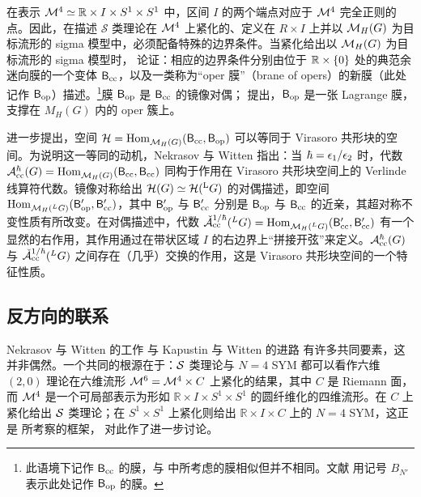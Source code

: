 在表示 $\mathcal{M}^4\simeq\mathbb{R}\times I\times S^1\times S^1$ 中，区间 $I$ 的两个端点对应于 $\mathcal{M}^4$ 完全正则的点。因此，在描述 $\mathcal{S}$ 类理论在 $\mathcal{M}^4$ 上紧化的、定义在 $R\times I$ 上并以 $\mathcal{M}_H(G)$ 为目标流形的 sigma 模型中，必须配备特殊的边界条件。当紧化给出以 $\mathcal{M}_H(G)$ 为目标流形的 sigma 模型时，\cite{NW} 论证：相应的边界条件分别由位于 $\mathbb{R}\times\{0\}$ 处的典范余迷向膜的一个变体 $\mathsf{B}_{\rm cc}$，以及一类称为“oper 膜”（brane of opers）的新膜（此处记作 $\mathsf{B}_{\rm op}$）描述。\footnote{此语境下记作 $\mathsf{B}_{\rm cc}$ 的膜，与 \cite{KW} 中所考虑的膜相似但并不相同。文献 \cite{NW} 用记号 $B_{N'}$ 表示此处记作 $\mathsf{B}_{\rm op}$ 的膜。}膜 $\mathsf{B}_{\rm op}$ 是 $\mathsf{B}_{\rm cc}$ 的镜像对偶；\cite{NW} 提出，$\mathsf{B}_{\rm op}$ 是一张 Lagrange 膜，支撑在 $M_H(G)$ 内的 oper 簇上。

\cite{NW} 进一步提出，空间 $\mathcal{H}={\rm Hom}_{\mathcal{M}_H(G)}^{}(\mathsf{B}_{\rm cc},\mathsf{B}_{\rm op})$ 可以等同于 Virasoro 共形块的空间。为说明这一等同的动机，Nekrasov 与 Witten 指出：当 $\hbar=\epsilon_1/\epsilon_2$ 时，代数 $\mathcal{A}_{\rm cc}^{\hbar}(G)={\rm Hom}_{\mathcal{M}_H(G)}^{}(\mathsf{B}_{\rm cc},\mathsf{B}_{\rm cc})$ 同构于作用在 Virasoro 共形块空间上的 Verlinde 线算符代数。镜像对称给出 $\mathcal{H}(G)\simeq\mathcal{H}({}^{\rm L}G)$ 的对偶描述，即空间 ${\rm Hom}_{\mathcal{M}_H({}^{L}G)}^{}({\mathsf{B}}_{\rm op}',{\mathsf{B}}_{\rm cc}')$，其中 ${\mathsf{B}}_{\rm op}'$ 与 ${\mathsf{B}}_{\rm cc}'$ 分别是 ${\mathsf{B}}_{\rm op}$ 与 ${\mathsf{B}}_{\rm cc}$ 的近亲，其超对称不变性质有所改变。在对偶描述中，代数 $\check{\mathcal{A}}_{\rm cc}^{1/\hbar}({}^{L}G)={\rm Hom}_{\mathcal{M}_H({}^{L}G)}^{}(\mathsf{B}_{\rm cc}',\mathsf{B}_{\rm cc}')$ 有一个显然的右作用，其作用通过在带状区域 $I$ 的右边界上“拼接开弦”来定义。$\mathcal{A}_{\rm cc}^{\hbar}(G)$ 与 $\check{\mathcal{A}}_{\rm cc}^{1/\hbar}({}^{L}G)$ 之间存在（几乎）交换的作用，这是 Virasoro 共形块空间的一个特征性质。

\subsection{反方向的联系}

Nekrasov 与 Witten 的工作\cite{NW} 与 Kapustin 与 Witten 的进路\cite{KW} 有许多共同要素，这并非偶然。一个共同的根源在于：$\mathcal{S}$ 类理论与 $N=4$ SYM\cite{Wi09} 都可以看作六维 $(2,0)$ 理论在六维流形 $\mathcal{M}^6=\mathcal{M}^4\times C$ 上紧化的结果，其中 $C$ 是 Riemann 面，而 $\mathcal{M}^4$ 是一个可局部表示为形如 $\mathbb{R}\times I \times S^1\times S^1$ 的圆纤维化的四维流形。在 $C$ 上紧化给出 $\mathcal{S}$ 类理论\cite{GMN2}；在 $S^1\times S^1$ 上紧化则给出 $\mathbb{R}\times I \times C$ 上的 $N=4$ SYM，这正是 \cite{KW} 所考察的框架，\cite{Wi09} 对此作了进一步讨论。


